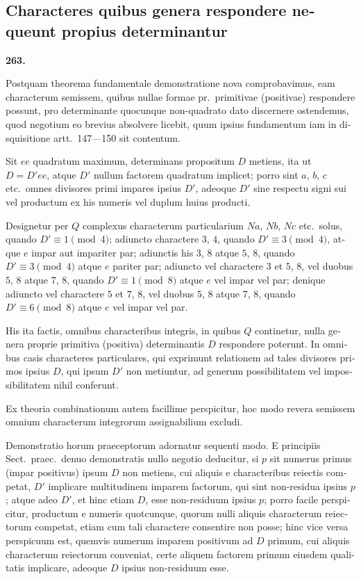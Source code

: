 \documentclass[12pt,a4paper]{article}
\theoremstyle{plain}
\theoremstyle{definition}
\theoremstyle{remark}
\begin{document}
\begin{otherlanguage}{latin}

\subsection*{Characteres quibus genera respondere nequeunt propius determinantur}

\textbf{263.}

Postquam theorema fundamentale demonstratione nova comprobavimus, eam characterum semissem, quibus nullae formae pr.\ primitivae (positivae) respondere possunt, pro determinante quocunque non-quadrato dato discernere ostendemus, quod negotium eo brevius absolvere licebit, quum ipsius fundamentum iam in disquisitione artt.\ 147---150 sit contentum.

Sit $ee$ quadratum maximum, determinans propositum $D$ metiens, ita ut $D = D'ee$, atque $D'$ nullum factorem quadratum implicet; porro sint $a$, $b$, $c$ etc.\ omnes divisores primi impares ipsius $D'$, adeoque $D'$ sine respectu signi sui vel productum ex his numeris vel duplum huius producti.

Designetur per $Q$ complexus characterum particularium $Na$, $Nb$, $Nc$ etc.\ solus, quando $D' \equiv 1 \pmod{4}$; adiuncto charactere $3$, $4$, quando $D' \equiv 3 \pmod{4}$, atque $e$ impar aut impariter par; adiunctis his $3$, $8$ atque $5$, $8$, quando $D' \equiv 3 \pmod{4}$ atque $e$ pariter par; adiuncto vel charactere $3$ et $5$, $8$, vel duobus $5$, $8$ atque $7$, $8$, quando $D' \equiv 1 \pmod{8}$ atque $e$ vel impar vel par; denique adiuncto vel charactere $5$ et $7$, $8$, vel duobus $5$, $8$ atque $7$, $8$, quando $D' \equiv 6 \pmod{8}$ atque $e$ vel impar vel par.

His ita factis, omnibus characteribus integris, in quibus $Q$ continetur, nulla genera proprie primitiva (positiva) determinantis $D$ respondere poterunt. In omnibus casis characteres particulares, qui exprimunt relationem ad tales divisores primos ipsius $D$, qui ipsum $D'$ non metiuntur, ad generum possibilitatem vel impossibilitatem nihil conferunt.

Ex theoria combinationum autem facillime perspicitur, hoc modo revera semissem omnium characterum integrorum assignabilium excludi.

Demonstratio horum praeceptorum adornatur sequenti modo. E principiis Sect.\ praec.\ denuo demonstratis nullo negotio deducitur, si $p$ sit numerus primus (impar positivus) ipsum $D$ non metiens, cui aliquis e characteribus reiectis competat, $D'$ implicare multitudinem imparem factorum, qui sint non-residua ipsius $p$; atque adeo $D'$, et hinc etiam $D$, esse non-residuum ipsius $p$; porro facile perspicitur, productum e numeris quotcunque, quorum nulli aliquis characterum reiectorum competat, etiam cum tali charactere consentire non posse; hinc vice versa perspicuum est, quemvis numerum imparem positivum ad $D$ primum, cui aliquis characterum reiectorum conveniat, certe aliquem factorem primum eiusdem qualitatis implicare, adeoque $D$ ipsius non-residuum esse.


\end{otherlanguage}
\end{document}
